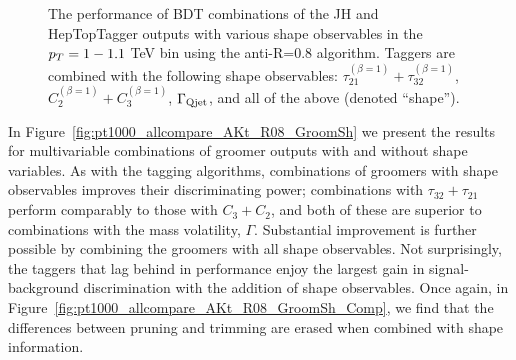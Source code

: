 \begin{figure}
\centering
{}
\caption{The performance of BDT combinations of the JH and HepTopTagger outputs with various shape observables in the $p_T = 1-1.1$ TeV bin using the anti-\kT R=0.8 algorithm. Taggers are combined with the following shape observables: $\tau_{21}^{(\beta=1)}+\tau_{32}^{(\beta=1)}$, $C_{2}^{(\beta=1)}+C_{3}^{(\beta=1)}$, $\Gamma_{\rm Qjet}$, and all of the above (denoted ``shape'').}
\label{fig:pt1000_allcompare_AKt_R08_TagSh}
\end{figure}

In Figure~\ref{fig:pt1000_allcompare_AKt_R08_GroomSh} we present the results for multivariable combinations of groomer outputs with and without shape variables. As with the tagging algorithms, combinations of groomers with shape observables improves their discriminating power; combinations with $\tau_{32}+\tau_{21}$ perform comparably to those with $C_3+C_2$, and both of these are superior to combinations with the mass volatility, $\Gamma$. Substantial improvement is further possible by combining the groomers with all shape observables. Not surprisingly, the taggers that lag behind in performance enjoy the largest gain in signal-background discrimination with the addition of shape observables. Once again, in Figure~\ref{fig:pt1000_allcompare_AKt_R08_GroomSh_Comp}, we find that the differences between pruning and trimming are erased when combined with shape information.


